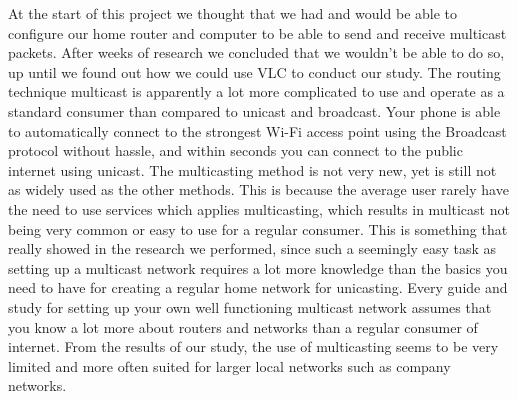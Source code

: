 \documentclass[9pt,a4paper]{acmproc}
\begin{document}
At the start of this project we thought that we had and would be able to configure our home router and computer to be able to send and receive multicast packets. After weeks of research we concluded that we wouldn't be able to do so, up until we found out how we could use VLC to conduct our study. The routing technique multicast is apparently a lot more complicated to use and operate as a standard consumer than compared to unicast and broadcast. Your phone is able to automatically connect to the strongest Wi-Fi access point using the Broadcast protocol without hassle, and within seconds you can connect to the public internet using unicast. The multicasting method is not very new, yet is still not as widely used as the other methods. This is because the average user rarely have the need to use services which applies multicasting, which results in multicast not being very common or easy to use for a regular consumer. This is something that really showed in the research we performed, since such a seemingly easy task as setting up a multicast network requires a lot more knowledge than the basics you need to have for creating a regular home network for unicasting. Every guide and study for setting up your own well functioning multicast network assumes that you know a lot more about routers and networks than a regular consumer of internet. From the results of our study, the use of multicasting seems to be very limited and more often suited for larger local networks such as company networks.

\clearpage
\end{document}
